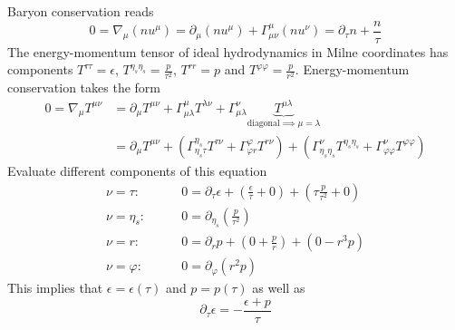 Baryon conservation reads
\begin{equation}
    0=\nabla_\mu(nu^\mu)=\partial_\mu(nu^\mu)+\Gamma^\mu_{\mu\nu}(nu^\nu)=\partial_\tau n+\frac{n}{\tau}
\end{equation}
The energy-momentum tensor of ideal hydrodynamics in Milne coordinates has components $T^{\tau\tau}=\epsilon$, $T^{\eta_s\eta_s}=\frac{p}{\tau^2}$, $T^{rr}=p$ and $T^{\varphi\varphi}=\frac{p}{r^2}$. Energy-momentum conservation takes the form
\begin{subequations}
    \begin{align}
        0=\nabla_\mu T^{\mu\nu} & =\partial_\mu T^{\mu\nu}+\Gamma^\mu_{\mu\lambda}T^{\lambda\nu}+\Gamma^\nu_{\mu\lambda}\underbrace{T^{\mu\lambda}}_{\text{diagonal}\implies\mu=\lambda}                                          \\
                                & =\partial_\mu T^{\mu\nu}+(\Gamma^{\eta_s}_{\eta_s\tau}T^{\tau\nu}+\Gamma^\varphi_{\varphi r}T^{r\nu})+(\Gamma^\nu_{\eta_s\eta_s}T^{\eta_s\eta_s}+\Gamma^\nu_{\varphi\varphi}T^{\varphi\varphi})
    \end{align}
\end{subequations}
Evaluate different components of this equation
\begin{subequations}
    \begin{align}
        \nu=\tau:    & \qquad 0 =\partial_\tau\epsilon+(\frac{\epsilon}{\tau}+0)+(\tau\frac{p}{\tau^2}+0) \\
        \nu=\eta_s:  & \qquad 0 =\partial_{\eta_s}(\frac{p}{\tau^2})                                      \\
        \nu=r:       & \qquad 0 =\partial_rp+(0+\frac{p}{r})+(0-r^3p)                                     \\
        \nu=\varphi: & \qquad 0 =\partial_\varphi(r^2p)
    \end{align}
\end{subequations}
This implies that $\epsilon=\epsilon(\tau)$ and $p=p(\tau)$ as well as
\begin{equation}
    \partial_\tau\epsilon=-\frac{\epsilon+p}{\tau}
\end{equation}

\done{}


